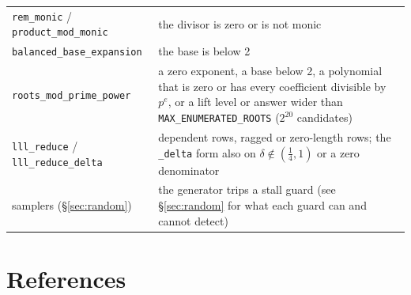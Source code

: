 \documentclass[11pt]{article}
\newcommand{\code}[1]{\texttt{#1}}
\begin{document}
\begin{center}
\begin{tabular}{@{}>{\raggedright\arraybackslash}p{}>{\raggedright\arraybackslash}p{}@{}}
\code{rem\_monic} / \code{product\_mod\_monic} & the divisor is zero or is not monic \\
\code{balanced\_base\_expansion} & the base is below 2 \\
\code{roots\_mod\_prime\_power} & a zero exponent, a base below 2, a polynomial that is zero or has every coefficient divisible by $p^e$, or a lift level or answer wider than \code{MAX\_ENUMERATED\_ROOTS} ($2^{20}$ candidates) \\
\code{lll\_reduce} / \code{lll\_reduce\_delta} & dependent rows, ragged or zero-length rows; the \code{\_delta} form also on $\delta \notin (\tfrac14, 1)$ or a zero denominator \\
samplers (\S\ref{sec:random}) & the generator trips a stall guard (see \S\ref{sec:random} for what each guard can and cannot detect) \\
\bottomrule
\end{tabular}
\end{center}

\section*{References}
\end{document}
